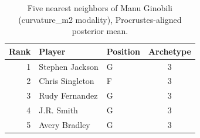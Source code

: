 \begin{table}[htbp]
  \centering\small
  \begin{tabular}{rllc}
    \toprule
    Rank & Player & Position & Archetype \\
    \midrule
    1 & Stephen Jackson & G & 3 \\
    2 & Chris Singleton & F & 3 \\
    3 & Rudy Fernandez & G & 3 \\
    4 & J.R. Smith & G & 3 \\
    5 & Avery Bradley & G & 3 \\
    \bottomrule
  \end{tabular}
  \caption{Five nearest neighbors of Manu Ginobili (curvature_m2 modality), Procrustes-aligned posterior mean.}
  \label{tab:Manu_Ginobili_neighbors_curvature_m2}
\end{table}


